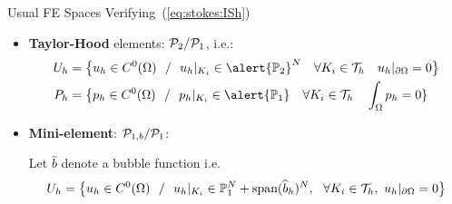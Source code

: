 \begin{frame}{Usual FE Spaces Verifying~(\ref{eq:stokes:ISh})}
  \begin{itemize}
  \item \textbf{Taylor-Hood} elements: \alert{$\P2/\P1$}, i.e.:
    \begin{align*}
      \Uh &= \big\{\uh \in C^0(\Omega) \ \st\ \uh|_{K_i}\in \alert{\mathbb{P}_{2}}^N \quad \forall K_i\in \Th \quad \uh|_{\partial\Omega}=0\big\}
      \\
      \Ph &= \big\{\ph \in C^0(\Omega) \ \st\ \ph|_{K_i}\in \alert{\mathbb{P}_{1}} \quad \forall K_i\in \Th \quad \int_\Omega \ph=0\}
    \end{align*}

  \item
    \textbf{Mini-element}: \alert{$\P{1,b} / \P1$}:
    \par Let $\widehat b$ denote a \alert{bubble function} i.e. 
    \begin{align*}
      \Uh = \big\{\uh \in C^0(\Omega) \ \st\
      \uh|_{K_i}\in \mathbb{P}_1^N+\text{span}(\widehat{b}_h)^N,
      \ \ \forall K_i\in \Th, \ \uh|_{\partial\Omega}=0\big\}
    \end{align*}

  \end{itemize}
\end{frame}

